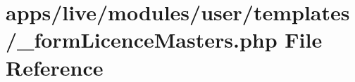 \hypertarget{live_2modules_2user_2templates_2__form_licence_masters_8php}{\section{apps/live/modules/user/templates/\-\_\-form\-Licence\-Masters.php File Reference}
\label{live_2modules_2user_2templates_2__form_licence_masters_8php}
}
